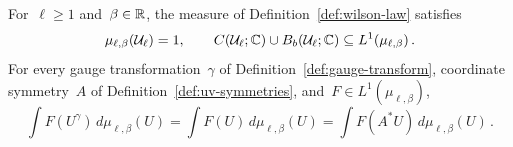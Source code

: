\begin{proposition}\label{prop:uv-law}
For~$\ell\ge1$ and~$\beta\in\mathbb R$, the measure of Definition~\ref{def:wilson-law} satisfies
\begin{equation}\label{eq:uv-law}
 \mu_{\ell,\beta}(\mathcal U_\ell)=1,\qquad
 C(\mathcal U_\ell;\mathbb C)\cup B_b(\mathcal U_\ell;\mathbb C)
 \subseteq L^1(\mu_{\ell,\beta})\,.
\end{equation}
For every gauge transformation~$\gamma$ of Definition~\ref{def:gauge-transform}, coordinate symmetry~$A$ of Definition~\ref{def:uv-symmetries}, and~$F\in L^1(\mu_{\ell,\beta})$,
\begin{equation}\label{eq:uv-expectation-symmetry}
 \int F(U^\gamma)\,d\mu_{\ell,\beta}(U)
 =\int F(U)\,d\mu_{\ell,\beta}(U)
 =\int F(A^*U)\,d\mu_{\ell,\beta}(U)\,.
\end{equation}
\end{proposition}

